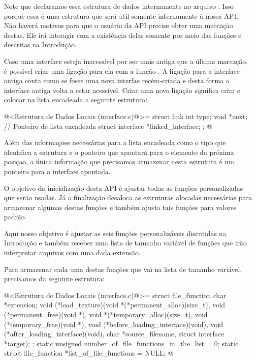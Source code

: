 Note que declaramos essa estrutura de dados internamente no arquivo
. Isso porque essa é uma estrutura que será
útil somente internamente à nossa API. Não haverá motivos para que o
usuário da API precise obter uma marcação destas. Ele irá interagir
com a existência delas somente por meio das funções
 e
 descritas na Introdução.


Caso uma interface esteja inacessível por ser mais antiga que a última
marcação, é possível criar uma ligação para ela com a função
. A ligação para a interface antiga
conta como se fosse uma nova interfae recém-criada e desta forma a
interface antiga volta a estar acessível. Criar uma nova ligação
significa criar e colocar na lista encadeada a seguinte estrutura:

\iniciocodigo
@<Estrutura de Dados Locais (interface.c)@>=
struct link {
  int type;
  void *next; // Ponteiro de lista encadeada
  struct interface *linked_interface;
};
@
\fimcodigo

Além das informações necessárias para a lista encadeada como o tipo
que identifica a estrutura e o ponteiro que apontará para o elemento
da próxima posiçao, a única informação que precisamos armazenar nesta
estrutura é um ponteiro para a interface apontada.


O objetivo da inicialização desta API é ajustar todas as funções
personalizadas que serão usadas. Já a finalização desaloca as
estruturas alocadas necessárias para armazenar algumas destas funções
e também ajusta tais funções para valores padrão.


Aqui nosso objetivo é ajustar as seis funções personalizáveis
discutidas na Introdução e também receber uma lista de tamanho
variável de funções que irão interpretar arquivos com uma dada
extensão.

Para armazenar cada uma destas funções que vai na lista de tamanho
variável, precisamos da seguinte estrutura:

\iniciocodigo
@<Estrutura de Dados Locais (interface.c)@>=
struct file_function {
  char *extension;
  void (*load_texture)(void *(*permanent_alloc)(size_t),
                      void (*permanent_free)(void *),
                      void *(*temporary_alloc)(size_t),
                      void (*temporary_free)(void *),
                      void (*before_loading_interface)(void),
                      void (*after_loading_interface)(void),
                      char *source_filename, struct interface *target);
};
static unsigned number_of_file_functions_in_the_list = 0;
static struct file_function *list_of_file_functions = NULL;
@
\fimcodigo

